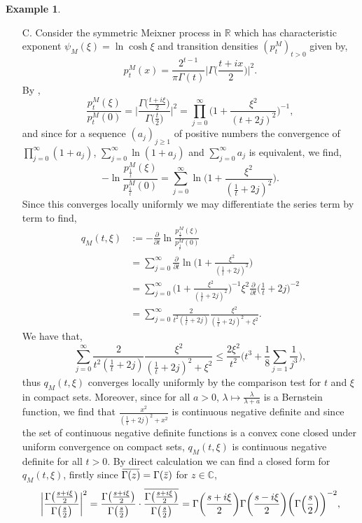 \documentclass[a4paper, 12pt]{report}
\theoremstyle{remark}
\theoremstyle{definition}
\newtheorem{example}[theorem]{Example}
\newcommand{\overbar}[1]{\mkern 1.5mu\overline{\mkern-1.5mu#1\mkern-1.5mu}\mkern 1.5mu}
\begin{document}
\begin{example}
\begin{itemize}
\item[C.] Consider the symmetric Meixner process in $\mathbb{R}$ which has characteristic exponent $\psi_M(\xi) = \ln\cosh\xi$ and transition densities $(p_t^M)_{t > 0}$ given by,
\begin{equation}\label{SMPTD}
p_t^M(x) = \frac{2^{t - 1}}{\pi\Gamma(t)}\bigg|\Gamma\Big(\frac{t + ix}{2}\Big)\bigg|^2.
\end{equation}
By \cite[Example 5.4]{DProofPaper},
$$
\frac{p_t^M(\xi)}{p_t^M(0)} = \bigg|\frac{\Gamma\big(\frac{t + i\xi}{2}\big)}{\Gamma\big(\frac{t}{2}\big)}\bigg|^2 = \prod_{j = 0}^\infty\bigg(1 + \frac{\xi^2}{(t + 2j)^2}\bigg)^{-1},
$$
and since for a sequence $(a_j)_{j \ge 1}$ of positive numbers the convergence of $\prod_{j = 0}^\infty(1 + a_j)$, $\sum_{j = 0}^\infty\ln(1 + a_j)$ and $\sum_{j = 0}^\infty a_j$ is equivalent, we find,
$$
-\ln\frac{p_\frac{1}{t}^M(\xi)}{p_\frac{1}{t}^M(0)} = \sum_{j = 0}^\infty\ln\bigg(1 + \frac{\xi^2}{(\frac{1}{t} + 2j)^2}\bigg).
$$
Since this converges locally uniformly we may differentiate the series term by term to find,
$$
\begin{aligned}
q_M(t, \xi) & := -\frac{\partial}{\partial t}\ln\frac{p_\frac{1}{t}^M(\xi)}{p_\frac{1}{t}^M(0)}\\
& = \sum_{j = 0}^\infty\frac{\partial}{\partial t}\ln\bigg(1 + \frac{\xi^2}{(\frac{1}{t} + 2j)^2}\bigg)\\
& = \sum_{j = 0}^\infty\bigg(1 + \frac{\xi^2}{(\frac{1}{t} + 2j)^2}\bigg)^{-1}\xi^2\frac{\partial}{\partial t}\Big(\frac{1}{t} + 2j\Big)^{-2}\\
& = \sum_{j = 0}^\infty\frac{2}{t^2(\frac{1}{t} + 2j)}\frac{\xi^2}{(\frac{1}{t} + 2j)^2 + \xi^2}.
\end{aligned}
$$
We have that,
$$
\sum_{j = 0}^\infty\frac{2}{t^2(\frac{1}{t} + 2j)}\frac{\xi^2}{(\frac{1}{t} + 2j)^2 + \xi^2} \le \frac{2\xi^2}{t^2}\bigg(t^3 + \frac{1}{8}\sum_{j = 1}\frac{1}{j^3}\bigg),
$$
thus $q_M(t, \xi)$ converges locally uniformly by the comparison test for $t$ and $\xi$ in compact sets.  Moreover, since for all $a > 0$, $\lambda \mapsto \frac{\lambda}{\lambda + a}$ is a Bernstein function, we find that $\frac{x^2}{(\frac{1}{t} + 2j)^2 + x^2}$ is continuous negative definite and since the set of continuous negative definite functions is a convex cone closed under uniform convergence on compact sets, $q_M(t, \xi)$ is continuous negative definite for all $t > 0$.  By direct calculation we can find a closed form for $q_M(t, \xi)$, firstly since $\overbar{\Gamma(z)} = \Gamma(\bar{z})$ for $z \in \mathbb{C}$,
$$
\bigg|\frac{\Gamma\big(\frac{s + i\xi}{2}\big)}{\Gamma\big(\frac{s}{2}\big)}\bigg|^2 = \frac{\Gamma\big(\frac{s + i\xi}{2}\big)}{\Gamma\big(\frac{s}{2}\big)}\cdot\overbar{\frac{\Gamma\big(\frac{s + i\xi}{2}\big)}{\Gamma\big(\frac{s}{2}\big)}} = \Gamma\bigg(\frac{s + i\xi}{2}\bigg)\Gamma\bigg(\frac{s - i\xi}{2}\bigg)\bigg(\Gamma\Big(\frac{s}{2}\Big)\bigg)^{-2},
$$
\end{itemize}
\end{example}
\end{document}
